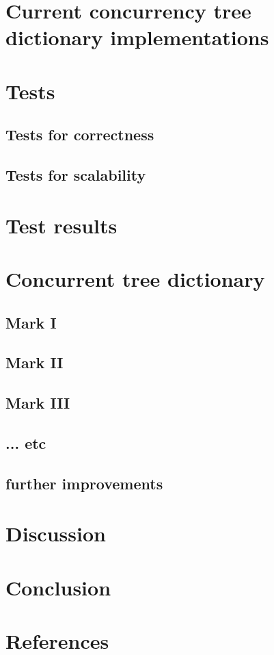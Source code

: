 \documentclass{article}
\begin{document}
\section{Current concurrency tree dictionary implementations}

\section{Tests}
\subsection{Tests for correctness}
\subsection{Tests for scalability}

\section{Test results}


\section{Concurrent tree dictionary}
\subsection{Mark I}
\subsection{Mark II}
\subsection{Mark III}
\subsection{... etc}

\subsection{further improvements}

\section{Discussion}

\section{Conclusion}

\section{References}
\end{document}
